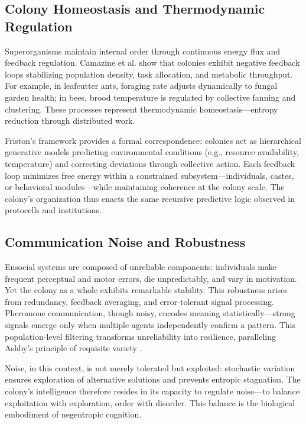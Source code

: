 \documentclass[11pt,a4paper]{article}
\begin{document}
\subsection{Colony Homeostasis and Thermodynamic Regulation}

Superorganisms maintain internal order through continuous energy flux and feedback regulation.  Camazine et al. \citep{Camazine2001SelfOrganizationBiologicalSystems} show that colonies exhibit negative feedback loops stabilizing population density, task allocation, and metabolic throughput.  For example, in leafcutter ants, foraging rate adjusts dynamically to fungal garden health; in bees, brood temperature is regulated by collective fanning and clustering.  These processes represent thermodynamic homeostasis—entropy reduction through distributed work.

Friston’s framework \citep{Friston2013LifeAsWeKnowIt} provides a formal correspondence: colonies act as hierarchical generative models predicting environmental conditions (e.g., resource availability, temperature) and correcting deviations through collective action.  Each feedback loop minimizes free energy within a constrained subsystem—individuals, castes, or behavioral modules—while maintaining coherence at the colony scale.  The colony’s organization thus enacts the same recursive predictive logic observed in protocells and institutions.

\subsection{Communication Noise and Robustness}

Eusocial systems are composed of unreliable components: individuals make frequent perceptual and motor errors, die unpredictably, and vary in motivation.  Yet the colony as a whole exhibits remarkable stability.  This robustness arises from redundancy, feedback averaging, and error-tolerant signal processing.  Pheromone communication, though noisy, encodes meaning statistically—strong signals emerge only when multiple agents independently confirm a pattern.  This population-level filtering transforms unreliability into resilience, paralleling Ashby’s principle of requisite variety \citep{Ashby1956DesignBrain}.

Noise, in this context, is not merely tolerated but exploited: stochastic variation ensures exploration of alternative solutions and prevents entropic stagnation.  The colony’s intelligence therefore resides in its capacity to regulate noise—to balance exploitation with exploration, order with disorder.  This balance is the biological embodiment of negentropic cognition.
\end{document}
